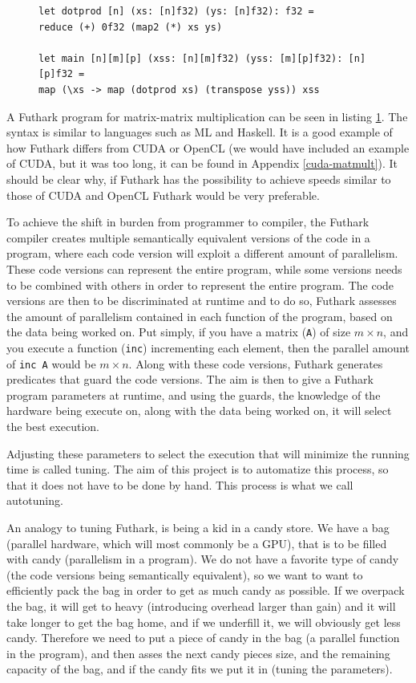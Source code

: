 \begin{figure}
\centering
\lstset{language=haskell}
\begin{lstlisting}
let dotprod [n] (xs: [n]f32) (ys: [n]f32): f32 =
reduce (+) 0f32 (map2 (*) xs ys)

let main [n][m][p] (xss: [n][m]f32) (yss: [m][p]f32): [n][p]f32 =
map (\xs -> map (dotprod xs) (transpose yss)) xss
\end{lstlisting}%
\label{IntromatmultFuthark}
\end{figure}
A Futhark program for matrix-matrix multiplication can be seen in listing
\ref{IntromatmultFuthark}. The syntax is similar to languages such as ML and
Haskell. It is a good example of how Futhark differs from CUDA or OpenCL (we
would have included an example of CUDA, but it was too long, it can be found in Appendix
\ref{cuda-matmult}). It should be clear why, if Futhark has the possibility to achieve speeds similar to those of CUDA and OpenCL Futhark would be very preferable.


To achieve the shift in burden from programmer to compiler, the Futhark compiler creates multiple semantically
equivalent versions of the code in a program, where each code version will
exploit a different amount of parallelism. These code versions can represent the entire program, while some versions needs to be combined with others in order to represent the entire program. The code versions are then to be
discriminated at runtime and to do so, Futhark assesses
the amount of parallelism contained in each function of the program, based on the
data being worked on. Put simply, if you have a matrix (\texttt{A}) of size $m
\times n$, and you execute a function (\texttt{inc}) incrementing each element,
then the parallel amount of \texttt{inc A} would be $m \times n$. Along with
these code versions, Futhark generates predicates that guard the code versions.
The aim is then to give a Futhark program parameters at runtime, and using the
guards, the knowledge of the hardware being execute on, along with the data
being worked on, it will select the best execution.

Adjusting these parameters to select the execution that will minimize the
running time is called tuning. The aim of this project is to automatize this
process, so that it does not have to be done by hand. This process is what we
call autotuning.

An analogy to tuning Futhark, is being a kid in a candy store. We have a bag
(parallel hardware, which will most commonly be a GPU), that is to be filled
with candy (parallelism in a program). We do not have a favorite type of candy
(the code versions being semantically equivalent), so we want to want to
efficiently pack the bag in order to get as much candy as possible. If we
overpack the bag, it will get to heavy (introducing overhead larger than gain)
and it will take longer to get the bag home, and if we underfill it, we will
obviously get less candy. Therefore we need to put a piece of candy in the bag
(a parallel function in the program), and then asses the next candy pieces
size, and the remaining capacity of the bag, and if the candy fits we put it in
(tuning the parameters). 
